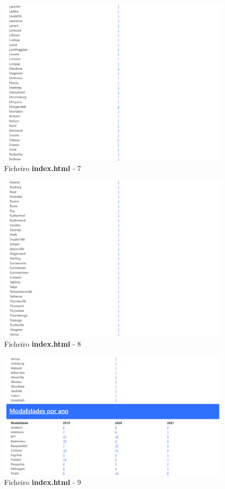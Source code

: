 \documentclass[runningheads]{llncs}
\begin{document}
\begin{figure}
    \centering
    \includegraphics[width=\linewidth]{assets/index7.png}
    \caption{Ficheiro \textbf{index.html} - 7}
    \label{fig:index.html7}
\end{figure}


\begin{figure}
    \centering
    \includegraphics[width=\linewidth]{assets/index8.png}
    \caption{Ficheiro \textbf{index.html} - 8}
    \label{fig:index.html8}
\end{figure}


\begin{figure}
    \centering
    \includegraphics[width=\linewidth]{assets/index9.png}
    \caption{Ficheiro \textbf{index.html} - 9}
    \label{fig:index.html9}
\end{figure}
\end{document}
